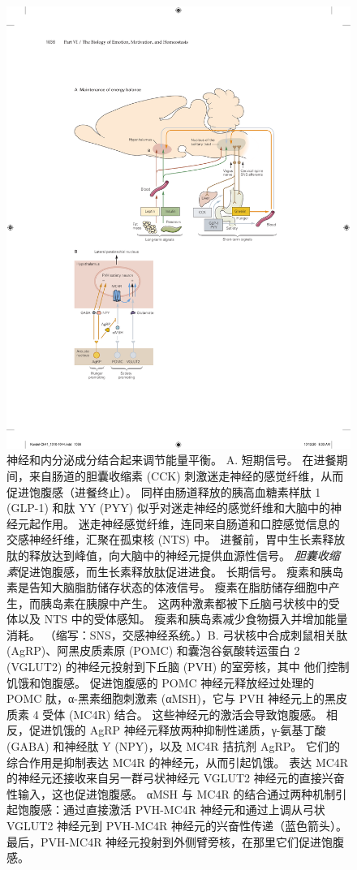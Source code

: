\begin{figure}[htbp]
	\centering
	\includegraphics[width=0.8\linewidth]{chap41/fig_41_14}
	\caption{神经和内分泌成分结合起来调节能量平衡。 A. 短期信号。 在进餐期间，来自肠道的胆囊收缩素 (CCK) 刺激迷走神经的感觉纤维，从而促进饱腹感（进餐终止）。 同样由肠道释放的胰高血糖素样肽 1 (GLP-1) 和肽 YY (PYY) 似乎对迷走神经的感觉纤维和大脑中的神经元起作用。 迷走神经感觉纤维，连同来自肠道和口腔感觉信息的交感神经纤维，汇聚在孤束核 (NTS) 中。 进餐前，胃中生长素释放肽的释放达到峰值，向大脑中的神经元提供血源性信号。 \textit{胆囊收缩素}促进饱腹感，而生长素释放肽促进进食。 长期信号。 瘦素和胰岛素是告知大脑脂肪储存状态的体液信号。 瘦素在脂肪储存细胞中产生，而胰岛素在胰腺中产生。 这两种激素都被下丘脑弓状核中的受体以及 NTS 中的受体感知。 瘦素和胰岛素减少食物摄入并增加能量消耗。 （缩写：SNS，交感神经系统。）B. 弓状核中合成刺鼠相关肽 (AgRP)、阿黑皮质素原 (POMC) 和囊泡谷氨酸转运蛋白 2 (VGLUT2) 的神经元投射到下丘脑 (PVH) 的室旁核，其中 他们控制饥饿和饱腹感。 促进饱腹感的 POMC 神经元释放经过处理的 POMC 肽，α-黑素细胞刺激素 (αMSH)，它与 PVH 神经元上的黑皮质素 4 受体 (MC4R) 结合。 这些神经元的激活会导致饱腹感。 相反，促进饥饿的 AgRP 神经元释放两种抑制性递质，γ-氨基丁酸 (GABA) 和神经肽 Y (NPY)，以及 MC4R 拮抗剂 AgRP。 它们的综合作用是抑制表达 MC4R 的神经元，从而引起饥饿。 表达 MC4R 的神经元还接收来自另一群弓状神经元 VGLUT2 神经元的直接兴奋性输入，这也促进饱腹感。 αMSH 与 MC4R 的结合通过两种机制引起饱腹感：通过直接激活 PVH-MC4R 神经元和通过上调从弓状 VGLUT2 神经元到 PVH-MC4R 神经元的兴奋性传递（蓝色箭头）。 最后，PVH-MC4R 神经元投射到外侧臂旁核，在那里它们促进饱腹感。}
	\label{fig:41_14}
\end{figure}


